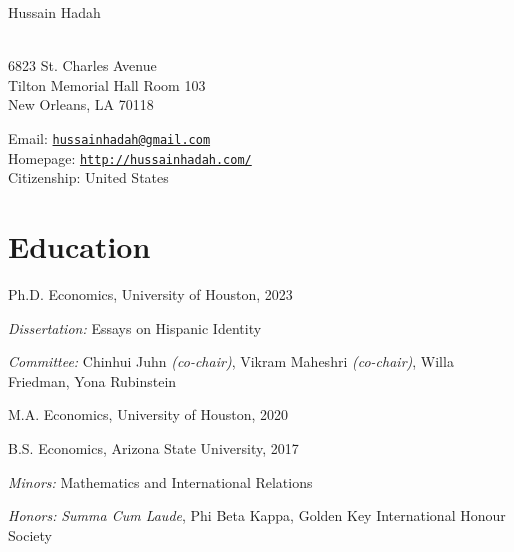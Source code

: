 \documentclass[10pt,letterpaper]{article}
\newcommand{\MYhref}[3][black]{\href{#2}{\color{#1}{#3}}}%
\def\name{Hussain Hadah}
\renewenvironment{itemize}{
  \begin{list}{}{
    \setlength{\leftmargin}{1.5em}
  }
}{
  \end{list}
}
\begin{document}
{\Huge \name}


\vspace{0.25in}

\begin{minipage}[t]{0.5\textwidth}
  \MYhref{https://tulane.edu/}{Tulane University} \\
  6823 St. Charles Avenue \\
  Tilton Memorial Hall Room 103 \\
  New Orleans, LA 70118 \\
\end{minipage}
\begin{minipage}[t]{0.5\textwidth}
  Email: \href{mailto:hussainhadah@gmail.com}{\tt hussainhadah@gmail.com} \\
  Homepage: \href{http://hussainhadah.com/}{\tt http://hussainhadah.com/} \\
  Citizenship: United States
\end{minipage}

\section*{Education}

\begin{itemize}
  \item Ph.D. Economics, University of Houston, 2023
  \begin{itemize}
    \item \textit{Dissertation:} Essays on Hispanic Identity
    \item \textit{Committee:} Chinhui Juhn \textit{(co-chair)}, Vikram Maheshri \textit{(co-chair)}, Willa Friedman, Yona Rubinstein
  \end{itemize}

  \item M.A. Economics, University of Houston, 2020

  \item B.S. Economics, Arizona State University, 2017
    \begin{itemize}
    \item \textit{Minors:} Mathematics and International Relations
    \item \textit{Honors:} \textit{Summa Cum Laude}, Phi Beta Kappa, Golden 
    Key International Honour Society
    \end{itemize}

\end{itemize}
\end{document}
